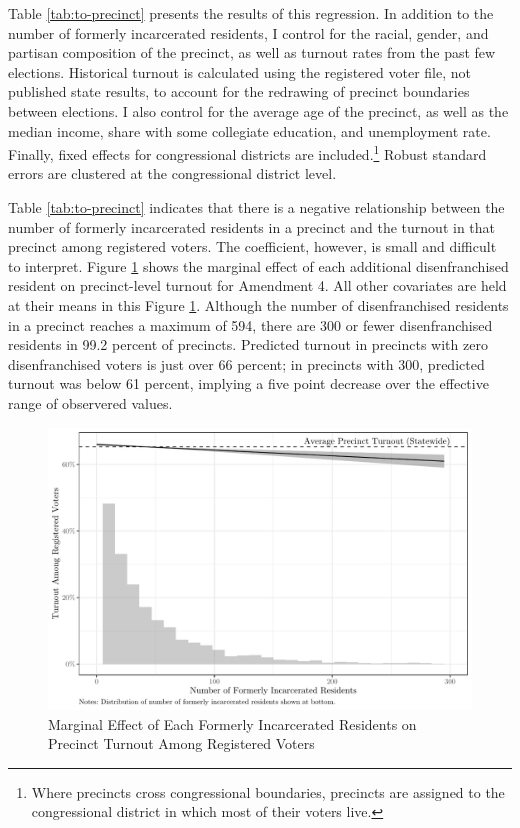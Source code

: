 \documentclass[
  12pt,
]{article}
\begin{document}
Table \ref{tab:to-precinct} presents the results of this regression. In addition to the number of formerly incarcerated residents, I control for the racial, gender, and partisan composition of the precinct, as well as turnout rates from the past few elections. Historical turnout is calculated using the registered voter file, not published state results, to account for the redrawing of precinct boundaries between elections. I also control for the average age of the precinct, as well as the median income, share with some collegiate education, and unemployment rate. Finally, fixed effects for congressional districts are included.\footnote{Where precincts cross congressional boundaries, precincts are assigned to the congressional district in which most of their voters live.} Robust standard errors are clustered at the congressional district level.

\begin{singlespace}


\end{singlespace}

Table \ref{tab:to-precinct} indicates that there is a negative relationship between the number of formerly incarcerated residents in a precinct and the turnout in that precinct among registered voters. The coefficient, however, is small and difficult to interpret. Figure \ref{fig:marg1} shows the marginal effect of each additional disenfranchised resident on precinct-level turnout for Amendment 4. All other covariates are held at their means in this Figure \ref{fig:marg1}. Although the number of disenfranchised residents in a precinct reaches a maximum of 594, there are 300 or fewer disenfranchised residents in 99.2 percent of precincts. Predicted turnout in precincts with zero disenfranchised voters is just over 66 percent; in precincts with 300, predicted turnout was below 61 percent, implying a five point decrease over the effective range of observered values.

\begin{figure}[H]

{\centering \includegraphics{write_files/figure-latex/marg1-1} 

}

\caption{\label{fig:marg1}Marginal Effect of Each Formerly Incarcerated Residents on Precinct Turnout Among Registered Voters}\label{fig:marg1}
\end{figure}
\end{document}
